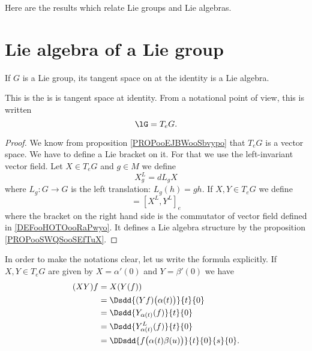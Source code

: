 
Here are the results which relate Lie groups and Lie algebras.

\section{Lie algebra of a Lie group}

\begin{propositionDef}      \label{DEFooKDCPooZOJsMD}
    If \( G\) is a Lie group, its tangent space on at the identity is a Lie algebra. 
    
    This is the  is is tangent space at identity. From a notational point of view, this is written
    \begin{equation}
        \lG=T_eG.
    \end{equation}
\end{propositionDef}

\begin{proof}
    We know from proposition \ref{PROPooEJBWooSbvypo} that \( T_eG\) is a vector space. We have to define a Lie bracket on it. For that we use the left-invariant vector field. Let \( X\in T_eG\) and \( g\in M\) we define
    \begin{equation}
        X^L_g=dL_gX
    \end{equation}
    where \( L_g\colon G\to G\) is the left translation: \( L_g(h)=gh\). If \( X,Y\in T_eG\) we define
    \begin{equation}
        [X,Y]=[X^L,Y^L]_e
    \end{equation}
    where the bracket on the right hand side is the commutator of vector field defined in \ref{DEFooHOTOooRaPwyo}. It defines a Lie algebra structure by the proposition \ref{PROPooSWQSooSEfTuX}.
\end{proof}

In order to make the notations clear, let us write the formula explicitly. If \( X,Y\in T_eG\) are given by \( X=\alpha'(0)\) and \( Y=\beta'(0)\) we have
\begin{subequations}        \label{SUBEQSooHKWMooQbeStl}
    \begin{align}
        (XY)f&=X(Y(f))\\
        &=\Dsdd{ (Yf)\big( \alpha(t) \big) }{t}{0}\\
        &=\Dsdd{ Y_{\alpha(t)}(f) }{t}{0}\\
        &=\Dsdd{ Y^L_{\alpha(t)}(f) }{t}{0}\\
        &=\DDsdd{ f\big( \alpha(t)\beta(u) \big) }{t}{0}{s}{0}.
    \end{align}
\end{subequations}

